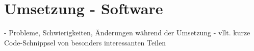 \chapter{Umsetzung - Software} \label{umsetzungSW}

\nocite{*}
- Probleme, Schwierigkeiten, Änderungen während der Umsetzung
- vllt. kurze Code-Schnippsel von besonders interessanten Teilen